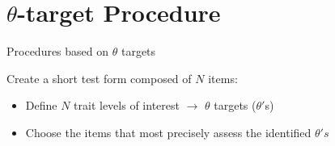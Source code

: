 \documentclass[aspectratio=149, compress]{beamer}
\begin{document}
%		
%	
%	
%	

\section[$\theta$-target]{$\theta$-target Procedure}

\begin{frame}{Procedures based on $\theta$ targets}
	
	Create a short test form composed of $N$ items:
	
	\vspace{1.5mm}
	\begin{itemize}
		\item Define $N$ trait levels of interest \color{template} 
		$\rightarrow$ \normalcolor $\theta$ targets ($\theta'$s)
		
		
		\vspace{1.5mm}
		\item Choose the items that most precisely assess the identified $\theta's$
		
	\end{itemize}
\end{frame}
\end{document}
